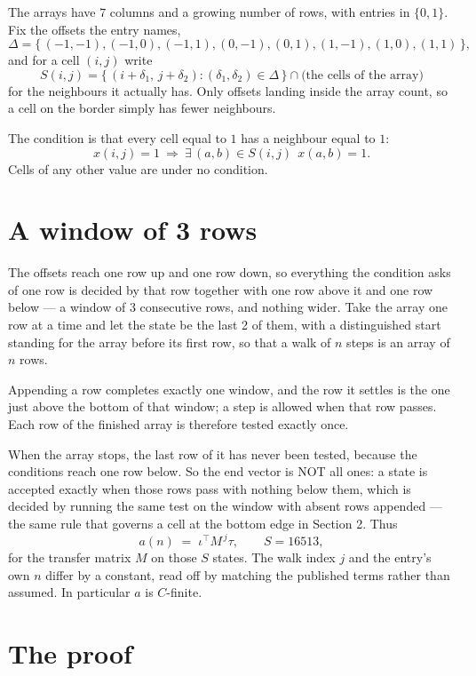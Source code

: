 \documentclass[11pt,a4paper]{article}
\theoremstyle{plain}
\theoremstyle{definition}
\begin{document}
The arrays have $7$ columns and a growing number of rows, with entries in $\{0,1\}$. Fix the
offsets the entry names,
\[
\Delta=\{\,(-1,-1), (-1,0), (-1,1), (0,-1), (0,1), (1,-1), (1,0), (1,1)\,\},
\]
and for a cell $(i,j)$ write
\[
S(i,j)=\{\,(i+\delta_1,\,j+\delta_2) : (\delta_1,\delta_2)\in\Delta\,\}\cap
\text{(the cells of the array)}
\]
for the neighbours it actually has. Only offsets landing inside the array count, so a cell on
the border simply has fewer neighbours.

The condition is that every cell equal to $1$ has a neighbour equal to $1$:
\[
x(i,j)=1\ \Longrightarrow\ \exists\,(a,b)\in S(i,j)\ \ x(a,b)=1 .
\]
Cells of any other value are under no condition.

\section{A window of 3 rows}

The offsets reach one row up and one row down, so everything the condition asks of one row is
decided by that row together with one row above it and one row below --- a window of
$3$ consecutive rows, and nothing wider. Take the array one row at a time and
let the state be the last 2 of them, with a distinguished start standing for the array before its
first row, so that a walk of $n$ steps is an array of $n$ rows.

Appending a row completes exactly one window, and the row it settles is the one just above the bottom of that window; a step is
allowed when that row passes. Each row of the finished array is therefore tested exactly once.

When the array stops, the last row of it has never been tested, because the
conditions reach one row below. So the end vector is NOT all ones: a state is accepted exactly when
those rows pass with nothing below them, which is decided by running the same test on the window
with absent rows appended --- the same rule that governs a cell at the bottom edge in
Section 2.
Thus
\[
a(n)\;=\;\iota^{\!\top}M^{\,j}\tau ,\qquad S=16513,
\]
for the transfer matrix $M$ on those $S$ states. The walk index $j$ and the entry's own $n$
differ by a constant, read off by matching the published terms rather than assumed. In
particular $a$ is $C$-finite.

\section{The proof}
\end{document}
